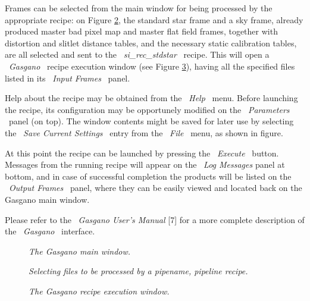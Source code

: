 Frames can be selected from the main window for being processed
by the appropriate recipe: on Figure \ref{GAS_SEL}, the standard star frame 
and a sky frame, already produced master bad pixel map and 
master flat field frames, together with distortion and slitlet distance tables,
and the necessary static calibration tables, are all selected 
and sent to the \ {\it si\_rec\_stdstar} \ recipe. This will
open a \ {\it Gasgano} \ recipe execution window (see Figure
\ref{GAS_REC}), having all the specified files listed in its 
\ {\it Input Frames} \ panel.

Help about the recipe may be obtained from the \ {\it Help} \ menu.
Before launching the recipe, its configuration may be
opportunely modified on the \ {\it Parameters} \ panel (on top). 
The window contents might be saved for later use
by selecting the \ {\it Save Current Settings} \ entry from the 
\ {\it File} \ menu, as shown in figure.

At this point the recipe can be launched by pressing the \ {\it Execute} \
button. Messages from the
running recipe will appear on the \ {\it Log Messages} panel at
bottom, and in case of successful completion the products will be listed
on the \ {\it Output Frames} \ panel, where they can be easily viewed
and located back on the Gasgano main window.

Please refer to the \ {\it Gasgano User's Manual} [7] for a more complete
description of the \ {\it Gasgano} \ interface.


\clearpage
\begin{figure}[h]
\begin{center}
\end{center}
\caption{\it The Gasgano main window.}
\label{GAS_MAIN}
\end{figure}

\begin{figure}[h]
\begin{center}
\end{center}
\caption{\it Selecting files to be processed by a pipename, pipeline recipe.}
\label{GAS_SEL}
\end{figure}

\begin{figure}[h]
\begin{center}
\end{center}
\caption{\it The Gasgano recipe execution window.}
\label{GAS_REC}
\end{figure}

